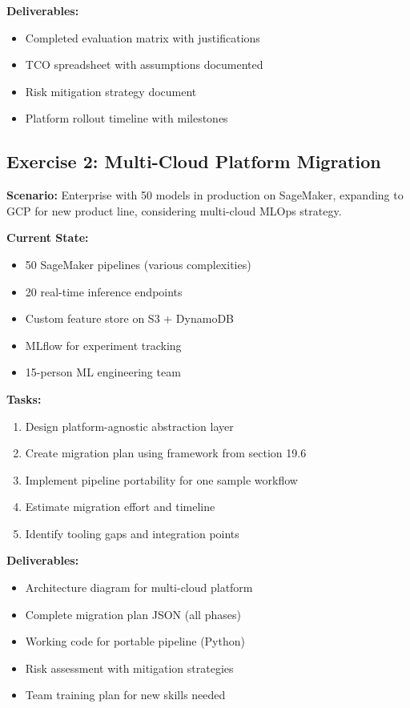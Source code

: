 \textbf{Deliverables:}
\begin{itemize}
    \item Completed evaluation matrix with justifications
    \item TCO spreadsheet with assumptions documented
    \item Risk mitigation strategy document
    \item Platform rollout timeline with milestones
\end{itemize}

\subsection{Exercise 2: Multi-Cloud Platform Migration}

\textbf{Scenario:} Enterprise with 50 models in production on SageMaker, expanding to GCP for new product line, considering multi-cloud MLOps strategy.

\textbf{Current State:}
\begin{itemize}
    \item 50 SageMaker pipelines (various complexities)
    \item 20 real-time inference endpoints
    \item Custom feature store on S3 + DynamoDB
    \item MLflow for experiment tracking
    \item 15-person ML engineering team
\end{itemize}

\textbf{Tasks:}
\begin{enumerate}
    \item Design platform-agnostic abstraction layer
    \item Create migration plan using framework from section 19.6
    \item Implement pipeline portability for one sample workflow
    \item Estimate migration effort and timeline
    \item Identify tooling gaps and integration points
\end{enumerate}

\textbf{Deliverables:}
\begin{itemize}
    \item Architecture diagram for multi-cloud platform
    \item Complete migration plan JSON (all phases)
    \item Working code for portable pipeline (Python)
    \item Risk assessment with mitigation strategies
    \item Team training plan for new skills needed
\end{itemize}

